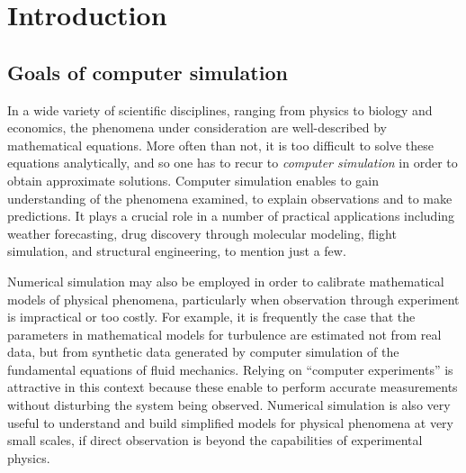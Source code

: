 \chapter*{Introduction}%

\section*{Goals of computer simulation}%
\label{sec:goals_of_computer_simulation}

In a wide variety of scientific disciplines,
ranging from physics to biology and economics,
the phenomena under consideration are well-described by mathematical equations.
More often than not,
it is too difficult to solve these equations analytically,
and so one has to recur to \emph{computer simulation} in order to obtain approximate solutions.
Computer simulation enables to gain understanding of the phenomena examined,
to explain observations and to make predictions.
It plays a crucial role in a number of practical applications including
weather forecasting, drug discovery through molecular modeling,
flight simulation, and structural engineering, to mention just a few.


Numerical simulation may also be employed in order to calibrate mathematical models of physical phenomena,
particularly when observation through experiment is impractical or too costly.
For example, it is frequently the case that the parameters in mathematical models for turbulence are estimated not from real data,
but from synthetic data generated by computer simulation of the fundamental equations of fluid mechanics.
Relying on ``computer experiments'' is attractive in this context because
these enable to perform accurate measurements without disturbing the system being observed.
Numerical simulation is also very useful to understand and build simplified models for physical phenomena at very small scales,
if direct observation is beyond the capabilities of experimental physics.

